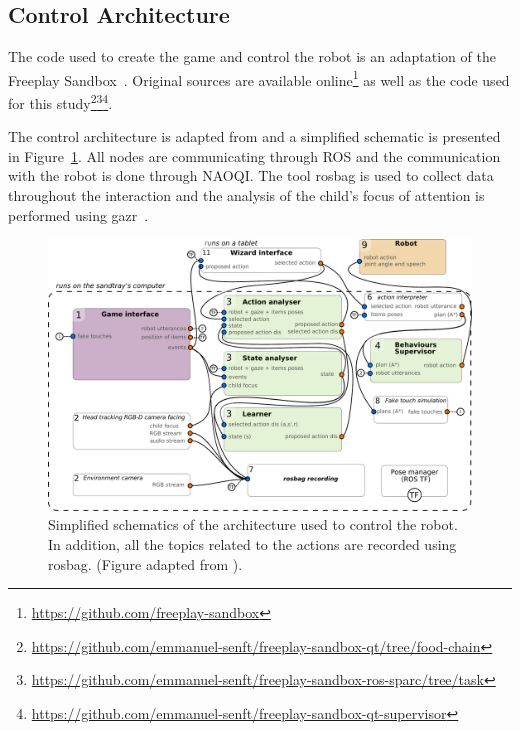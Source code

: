 \subsection{Control Architecture}

The code used to create the game and control the robot is an adaptation of the Freeplay Sandbox~\citep{lemaignan2017free}. Original sources are available online\footnote{\url{https://github.com/freeplay-sandbox}} as well as the code used for this study\footnote{\url{https://github.com/emmanuel-senft/freeplay-sandbox-qt/tree/food-chain}}\footnote{\url{https://github.com/emmanuel-senft/freeplay-sandbox-ros-sparc/tree/task}}\footnote{\url{https://github.com/emmanuel-senft/freeplay-sandbox-qt-supervisor}}.

The control architecture is adapted from \cite{lemaignan2017free} and a simplified schematic is presented in Figure~\ref{fig:tutoring_arch}. All nodes are communicating through ROS and the communication with the robot is done through NAOQI. The tool rosbag is used to collect data throughout the interaction and the analysis of the child's focus of attention is performed using gazr~\citep{lemaignan2016real}.

\begin{figure}[ht]
	\centering
	\includegraphics[width=1\textwidth]{architecture.pdf}
	\caption{Simplified schematics of the architecture used to control the robot. In addition, all the topics related to the actions are recorded using rosbag. (Figure adapted from \cite{lemaignan2017free}).}
	\label{fig:tutoring_arch}
\end{figure}


